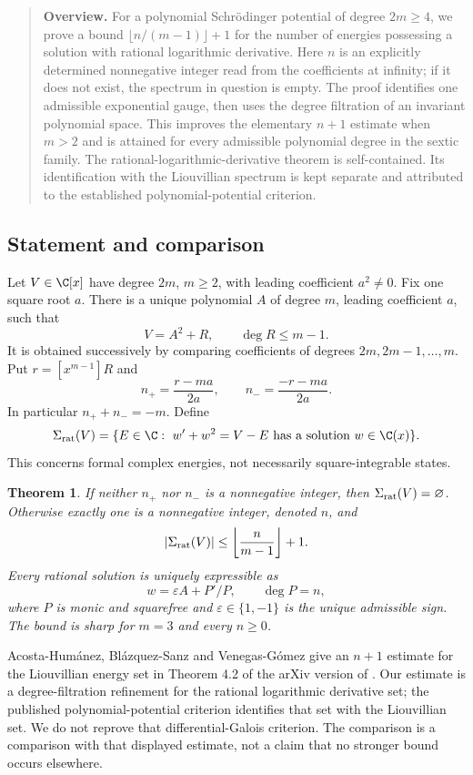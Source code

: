 \documentclass[11pt,a4paper]{article}
\newtheorem{theorem}{Theorem}[section]
\theoremstyle{definition}\newtheorem{definition}[theorem]{Definition}
\theoremstyle{remark}\newtheorem{remark}[theorem]{Remark}
\numberwithin{equation}{section}
\begin{document}
\begin{quote}\small\textbf{Overview.} For a polynomial Schr\"odinger potential of degree $2m\ge4$, we prove a bound
$\lfloor n/(m-1)\rfloor+1$ for the number of energies possessing a solution with rational logarithmic derivative. Here $n$ is an explicitly determined nonnegative integer read from the coefficients at infinity; if it does not exist, the spectrum in question is empty. The proof identifies one admissible exponential gauge, then uses the degree filtration of an invariant polynomial space. This improves the elementary $n+1$ estimate when $m>2$ and is attained for every admissible polynomial degree in the sextic family. The rational-logarithmic-derivative theorem is self-contained. Its identification with the Liouvillian spectrum is kept separate and attributed to the established polynomial-potential criterion.\end{quote}
\subsection{Statement and comparison}\label{H01-sec-1}
Let $V\in\C[x]$ have degree $2m$, $m\ge2$, with leading coefficient $a^2\ne0$. Fix one square root $a$. There is a unique polynomial $A$ of degree $m$, leading coefficient $a$, such that
\begin{equation}\label{H01-split} V=A^2+R,\qquad \deg R\le m-1.\end{equation}
It is obtained successively by comparing coefficients of degrees $2m,2m-1,\ldots,m$. Put $r=[x^{m-1}]R$ and
\[ n_+=\frac{r-ma}{2a},\qquad n_-=\frac{-r-ma}{2a}. \]
In particular $n_++n_-=-m$. Define
\[\Sigma_{\rm rat}(V)=\{E\in\C:\ w'+w^2=V-E\text{ has a solution }w\in\C(x)\}.\]
This concerns formal complex energies, not necessarily square-integrable states.
\begin{theorem}\label{H01-main}
If neither $n_+$ nor $n_-$ is a nonnegative integer, then $\Sigma_{\rm rat}(V)=\varnothing$. Otherwise exactly one is a nonnegative integer, denoted $n$, and
\begin{equation}\label{H01-bound}|\Sigma_{\rm rat}(V)|\le\left\lfloor\frac{n}{m-1}\right\rfloor+1.\end{equation}
Every rational solution is uniquely expressible as
\[w=\varepsilon A+P'/P,\qquad \deg P=n,\]
where $P$ is monic and squarefree and $\varepsilon\in\{1,-1\}$ is the unique admissible sign. The bound is sharp for $m=3$ and every $n\ge0$.
\end{theorem}
Acosta-Hum\'anez, Bl\'azquez-Sanz and Venegas-G\'omez give an $n+1$ estimate for the Liouvillian energy set in Theorem 4.2 of the arXiv version of \cite{ref080}. Our estimate is a degree-filtration refinement for the rational logarithmic derivative set; the published polynomial-potential criterion identifies that set with the Liouvillian set. We do not reprove that differential-Galois criterion. The comparison is a comparison with that displayed estimate, not a claim that no stronger bound occurs elsewhere.
\end{document}
